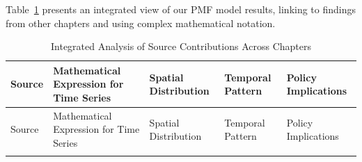\documentclass[
  letterpaper,
  oneside,
  openany]{MastersDoctoralThesis}
\theoremstyle{plain}
\theoremstyle{remark}
\begin{document}
Table~\ref{tbl-ch2-integrated} presents an integrated view of our PMF
model results, linking to findings from other chapters and using complex
mathematical notation.

\begin{longtable}[]{@{}
  >{\raggedright\arraybackslash}p{}
  >{\raggedright\arraybackslash}p{}
  >{\raggedright\arraybackslash}p{}
  >{\raggedright\arraybackslash}p{}
  >{\raggedright\arraybackslash}p{}@{}}
\caption{Integrated Analysis of Source Contributions Across
Chapters}\label{tbl-ch2-integrated}\tabularnewline
\toprule\noalign{}
\begin{minipage}[b]{\linewidth}\raggedright
Source
\end{minipage} & \begin{minipage}[b]{\linewidth}\raggedright
Mathematical Expression for Time Series
\end{minipage} & \begin{minipage}[b]{\linewidth}\raggedright
Spatial Distribution
\end{minipage} & \begin{minipage}[b]{\linewidth}\raggedright
Temporal Pattern
\end{minipage} & \begin{minipage}[b]{\linewidth}\raggedright
Policy Implications
\end{minipage} \\
\midrule\noalign{}
\endfirsthead
\toprule\noalign{}
\begin{minipage}[b]{\linewidth}\raggedright
Source
\end{minipage} & \begin{minipage}[b]{\linewidth}\raggedright
Mathematical Expression for Time Series
\end{minipage} & \begin{minipage}[b]{\linewidth}\raggedright
Spatial Distribution
\end{minipage} & \begin{minipage}[b]{\linewidth}\raggedright
Temporal Pattern
\end{minipage} & \begin{minipage}[b]{\linewidth}\raggedright
Policy Implications
\end{minipage} \\
\midrule\noalign{}
\endhead
\bottomrule\noalign{}
\endlastfoot

\end{longtable}
\end{document}
